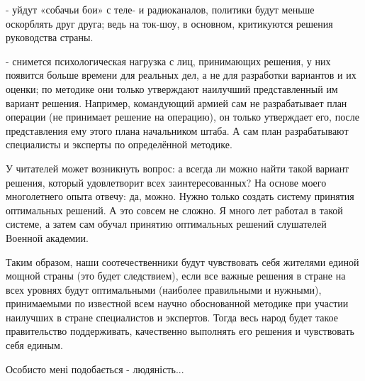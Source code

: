 \begin{itemize}
- уйдут «собачьи бои» с теле- и радиоканалов, политики будут меньше оскорблять
друг друга; ведь на ток-шоу, в основном, критикуются решения руководства
страны.

- снимется психологическая нагрузка с лиц, принимающих решения, у них появится
больше времени для реальных дел, а не для разработки вариантов и их оценки; по
методике они только утверждают наилучший представленный им вариант решения.
Например, командующий армией сам не разрабатывает план операции (не принимает
решение на операцию), он только утверждает его, после представления ему этого
плана начальником штаба. А сам план разрабатывают специалисты и эксперты по
определённой методике.

У читателей может возникнуть вопрос: а всегда ли можно найти такой вариант
решения, который удовлетворит всех заинтересованных? На основе моего
многолетнего опыта отвечу: да, можно. Нужно только создать систему принятия
оптимальных решений. А это совсем не сложно. Я много лет работал в такой
системе, а затем сам обучал принятию оптимальных решений слушателей Военной
академии.

Таким образом, наши соотечественники будут чувствовать себя жителями единой
мощной страны (это будет следствием), если все важные решения в стране на всех
уровнях будут оптимальными (наиболее правильными и нужными), принимаемыми по
известной всем научно обоснованной методике при участии наилучших в стране
специалистов и экспертов. Тогда весь народ будет такое правительство
поддерживать, качественно выполнять его решения и чувствовать себя единым.


Особисто мені подобається - людяність...


\end{itemize} %
